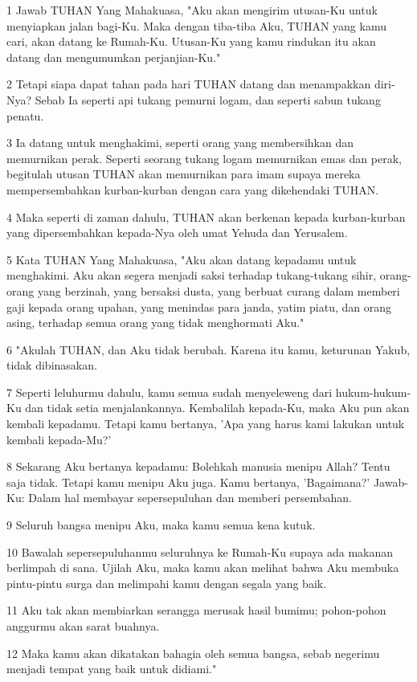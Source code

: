 \par 1 Jawab TUHAN Yang Mahakuasa, "Aku akan mengirim utusan-Ku untuk menyiapkan jalan bagi-Ku. Maka dengan tiba-tiba Aku, TUHAN yang kamu cari, akan datang ke Rumah-Ku. Utusan-Ku yang kamu rindukan itu akan datang dan mengumumkan perjanjian-Ku."
\par 2 Tetapi siapa dapat tahan pada hari TUHAN datang dan menampakkan diri-Nya? Sebab Ia seperti api tukang pemurni logam, dan seperti sabun tukang penatu.
\par 3 Ia datang untuk menghakimi, seperti orang yang membersihkan dan memurnikan perak. Seperti seorang tukang logam memurnikan emas dan perak, begitulah utusan TUHAN akan memurnikan para imam supaya mereka mempersembahkan kurban-kurban dengan cara yang dikehendaki TUHAN.
\par 4 Maka seperti di zaman dahulu, TUHAN akan berkenan kepada kurban-kurban yang dipersembahkan kepada-Nya oleh umat Yehuda dan Yerusalem.
\par 5 Kata TUHAN Yang Mahakuasa, "Aku akan datang kepadamu untuk menghakimi. Aku akan segera menjadi saksi terhadap tukang-tukang sihir, orang-orang yang berzinah, yang bersaksi dusta, yang berbuat curang dalam memberi gaji kepada orang upahan, yang menindas para janda, yatim piatu, dan orang asing, terhadap semua orang yang tidak menghormati Aku."
\par 6 "Akulah TUHAN, dan Aku tidak berubah. Karena itu kamu, keturunan Yakub, tidak dibinasakan.
\par 7 Seperti leluhurmu dahulu, kamu semua sudah menyeleweng dari hukum-hukum-Ku dan tidak setia menjalankannya. Kembalilah kepada-Ku, maka Aku pun akan kembali kepadamu. Tetapi kamu bertanya, 'Apa yang harus kami lakukan untuk kembali kepada-Mu?'
\par 8 Sekarang Aku bertanya kepadamu: Bolehkah manusia menipu Allah? Tentu saja tidak. Tetapi kamu menipu Aku juga. Kamu bertanya, 'Bagaimana?' Jawab-Ku: Dalam hal membayar sepersepuluhan dan memberi persembahan.
\par 9 Seluruh bangsa menipu Aku, maka kamu semua kena kutuk.
\par 10 Bawalah sepersepuluhanmu seluruhnya ke Rumah-Ku supaya ada makanan berlimpah di sana. Ujilah Aku, maka kamu akan melihat bahwa Aku membuka pintu-pintu surga dan melimpahi kamu dengan segala yang baik.
\par 11 Aku tak akan membiarkan serangga merusak hasil bumimu; pohon-pohon anggurmu akan sarat buahnya.
\par 12 Maka kamu akan dikatakan bahagia oleh semua bangsa, sebab negerimu menjadi tempat yang baik untuk didiami."

